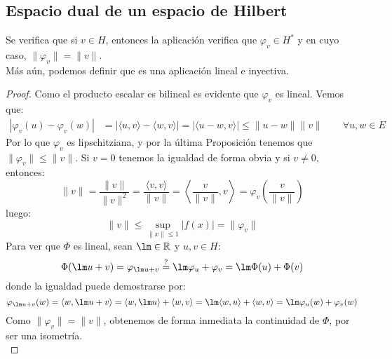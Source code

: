 \subsection{Espacio dual de un espacio de Hilbert}
\begin{prop}
    Se verifica que si $v\in H$, entonces la aplicación
    verifica que $\varphi_v\in H^\ast$ y en cuyo caso, $\|\varphi_v\| = \|v\|$.\\

    \noindent
    Más aún, podemos definir 
    que es una aplicación lineal e inyectiva.
    \begin{proof}
        Como el producto escalar es bilineal es evidente que $\varphi_v$ es lineal. Vemos que:
        \begin{align*}
            |\varphi_v(u) - \varphi_v(w)| &= |\langle u,v \rangle -\langle w,v \rangle | = |\langle u-w,v \rangle | \leq \|u-w\|\|v\| \qquad \forall u,w\in E
        \end{align*}
        Por lo que $\varphi_v$ es lipschitziana, y por la última Proposición tenemos que $\|\varphi_v\| \leq \|v\|$. Si $v=0$ tenemos la igualdad de forma obvia y si $v\neq 0$, entonces:
        \begin{equation*}
            \|v\| = \dfrac{\|v\|}{\|v\|^2} = \dfrac{\langle v,v \rangle }{\|v\|} = \left\langle \dfrac{v}{\|v\|},v \right\rangle  = \varphi_v\left(\dfrac{v}{\|v\|}\right)
        \end{equation*}
        luego:
        \begin{equation*}
            \|v\| \leq \sup_{\|x\|\leq 1}|f(x)| = \|\varphi_v\|
        \end{equation*}
        Para ver que $\Phi$ es lineal, sean $\lm\in \mathbb{R}$ y $u,v\in H$:
        \begin{equation*}
            \Phi(\lm u+v) = \varphi_{\lm u+v} \stackrel{\text{?}}{=} \lm \varphi_u + \varphi_v = \lm \Phi(u) + \Phi(v)
        \end{equation*}
        donde la igualdad puede demostrarse por:
        \begin{equation*}
            \varphi_{\lm u + v}(w) = \langle w,\lm u + v \rangle  = \langle w,\lm u \rangle  + \langle w,v \rangle  = \lm \langle w,u \rangle  + \langle w,v \rangle  = \lm \varphi_u(w) + \varphi_v(w)
        \end{equation*}
        Como $\|\varphi_v\|  = \|v\|$, obtenemos de forma inmediata la continuidad de $\Phi$, por ser una isometría.\\


\end{proof}
\end{prop}
